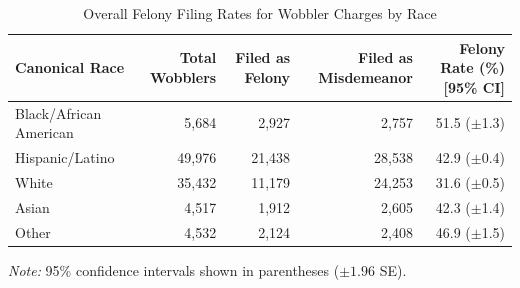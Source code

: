 \begin{table}
\caption{Overall Felony Filing Rates for Wobbler Charges by Race}
\label{tab:wobbler_overall}
\begin{tabular}{lrrrr}
\toprule
Canonical Race & Total Wobblers & Filed as Felony & Filed as Misdemeanor & Felony Rate (\%) [95\% CI] \\
\midrule
Black/African American & 5,684 & 2,927 & 2,757 & 51.5 ({\scriptsize $\pm$1.3}) \\
Hispanic/Latino & 49,976 & 21,438 & 28,538 & 42.9 ({\scriptsize $\pm$0.4}) \\
White & 35,432 & 11,179 & 24,253 & 31.6 ({\scriptsize $\pm$0.5}) \\
Asian & 4,517 & 1,912 & 2,605 & 42.3 ({\scriptsize $\pm$1.4}) \\
Other & 4,532 & 2,124 & 2,408 & 46.9 ({\scriptsize $\pm$1.5}) \\
\bottomrule
\end{tabular}
\smallskip
\parbox{\textwidth}{\footnotesize \textit{Note:} 95\% confidence intervals shown in parentheses ($\pm 1.96$ SE).}
\end{table}
